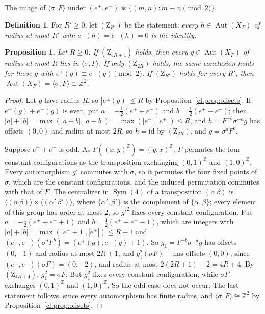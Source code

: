 \documentclass[11pt]{amsart}
\newtheorem{proposition}[theorem]{Proposition}
\theoremstyle{definition}
\newtheorem{definition}[theorem]{Definition}
\theoremstyle{remark}
\theoremstyle{plain}
\newcommand{\Z}{\mathbb{Z}}
\newcommand{\Aut}{\operatorname{Aut}}
\newcommand{\Sym}{\operatorname{Sym}}
\newcommand{\sh}{\sigma}
\begin{document}
The image of $\langle\sh,F\rangle$ under $(e^+,e^-)$ is $\{(m,n):m\equiv n\pmod2\}$.

\begin{definition}\label{cl:def:Z}
For $R'\ge0$, let $(\mathrm Z_{R'})$ be the statement: \emph{every $h\in\Aut(X_{F})$ of radius at most $R'$ with $e^+(h)=e^-(h)=0$ is the identity.}
\end{definition}

\begin{proposition}\label{cl:prop:reduce}
Let $R\ge0$. If $(\mathrm Z_{4R+4})$ holds, then every $g\in\Aut(X_{F})$ of radius at most $R$ lies in $\langle\sh,F\rangle$. If only $(\mathrm Z_{2R})$ holds, the same conclusion holds for those $g$ with $e^+(g)\equiv e^-(g)\pmod2$. If $(\mathrm Z_{R'})$ holds for every $R'$, then $\Aut(X_{F})=\langle\sh,F\rangle\cong\Z^2$.
\end{proposition}

\begin{proof}
Let $g$ have radius $R$, so $|e^\pm(g)|\le R$ by Proposition~\ref{cl:prop:offsets}. If $e^+(g)+e^-(g)$ is even, put $a=-\frac12(e^++e^-)$ and $b=\frac12(e^+-e^-)$; then $|a|+|b|=\max(|a+b|,|a-b|)=\max(|e^-|,|e^+|)\le R$, and $h=F^{-b}\sh^{-a}g$ has offsets $(0,0)$ and radius at most $2R$, so $h=\mathrm{id}$ by $(\mathrm Z_{2R})$, and $g=\sh^aF^b$.

Suppose $e^++e^-$ is odd. As $F((x,y)^{\Z})=(y,x)^{\Z}$, $F$ permutes the four constant configurations as the transposition exchanging $(0,1)^{\Z}$ and $(1,0)^{\Z}$. Every automorphism $g'$ commutes with $\sh$, so it permutes the four fixed points of $\sh$, which are the constant configurations, and the induced permutation commutes with that of $F$. The centralizer in $\Sym(4)$ of a transposition $(\alpha\,\beta)$ is $\langle(\alpha\,\beta)\rangle\times\langle(\alpha'\,\beta')\rangle$, where $\{\alpha',\beta'\}$ is the complement of $\{\alpha,\beta\}$; every element of this group has order at most $2$, so $g'^2$ fixes every constant configuration. Put $a=-\frac12(e^++e^-+1)$ and $b=\frac12(e^+-e^--1)$, which are integers with $|a|+|b|=\max(|e^-+1|,|e^+|)\le R+1$ and $(e^+,e^-)(\sh^aF^b)=(e^+(g),e^-(g)+1)$. So $g_1=F^{-b}\sh^{-a}g$ has offsets $(0,-1)$ and radius at most $2R+1$, and $g_1^2(\sh F)^{-1}$ has offsets $(0,0)$, since $(e^+,e^-)(\sh F)=(0,-2)$, and radius at most $2(2R+1)+2=4R+4$. By $(\mathrm Z_{4R+4})$, $g_1^2=\sh F$. But $g_1^2$ fixes every constant configuration, while $\sh F$ exchanges $(0,1)^{\Z}$ and $(1,0)^{\Z}$. So the odd case does not occur. The last statement follows, since every automorphism has finite radius, and $\langle\sh,F\rangle\cong\Z^2$ by Proposition~\ref{cl:prop:offsets}.
\end{proof}
\end{document}
